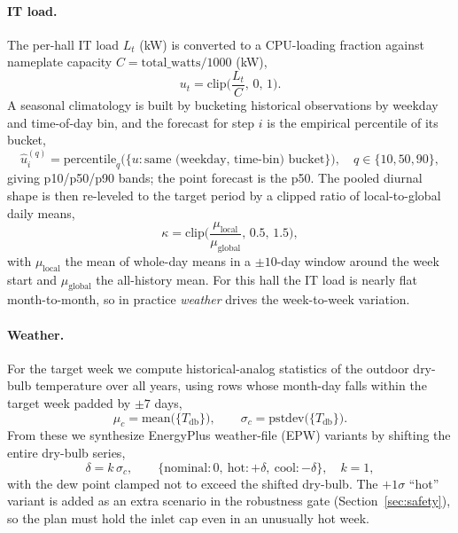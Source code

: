 \documentclass[11pt]{article}
\begin{document}
\paragraph{IT load.} The per-hall IT load \(L_t\) (kW) is converted to a CPU-loading
fraction against nameplate capacity \(C = \mathrm{total\_watts}/1000\) (kW),
\begin{equation}
u_t = \mathrm{clip}\!\Big(\frac{L_t}{C},\,0,\,1\Big).
\label{eq:loadfrac}
\end{equation}
A seasonal climatology is built by bucketing historical observations by weekday and
time-of-day bin, and the forecast for step \(i\) is the empirical percentile of its
bucket,
\begin{equation}
\widehat{u}^{(q)}_i = \mathrm{percentile}_q\big(\{u : \text{same (weekday, time-bin) bucket}\}\big),
\quad q\in\{10,50,90\},
\label{eq:climatology}
\end{equation}
giving p10/p50/p90 bands; the point forecast is the p50. The pooled diurnal shape is then
re-leveled to the target period by a clipped ratio of local-to-global daily means,
\begin{equation}
\kappa = \mathrm{clip}\!\Big(\frac{\mu_{\mathrm{local}}}{\mu_{\mathrm{global}}},\,0.5,\,1.5\Big),
\label{eq:level}
\end{equation}
with \(\mu_{\mathrm{local}}\) the mean of whole-day means in a \(\pm 10\)-day window around
the week start and \(\mu_{\mathrm{global}}\) the all-history mean. For this hall the IT load
is nearly flat month-to-month, so in practice \emph{weather} drives the week-to-week
variation.

\paragraph{Weather.} For the target week we compute historical-analog statistics of the
outdoor dry-bulb temperature over all years, using rows whose month-day falls within the
target week padded by \(\pm 7\) days,
\begin{equation}
\mu_c = \mathrm{mean}\big(\{T_{\mathrm{db}}\}\big),
\qquad
\sigma_c = \mathrm{pstdev}\big(\{T_{\mathrm{db}}\}\big).
\label{eq:weatherstats}
\end{equation}
From these we synthesize EnergyPlus weather-file (EPW) variants by shifting the entire
dry-bulb series,
\begin{equation}
\delta = k\,\sigma_c,
\qquad
\{\text{nominal}: 0,\ \text{hot}: +\delta,\ \text{cool}: -\delta\},
\quad k=1,
\label{eq:weathervariants}
\end{equation}
with the dew point clamped not to exceed the shifted dry-bulb. The \(+1\sigma\) ``hot''
variant is added as an extra scenario in the robustness gate (Section~\ref{sec:safety}),
so the plan must hold the inlet cap even in an unusually hot week.
\end{document}
